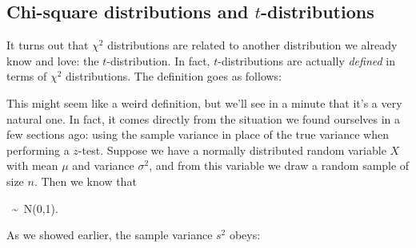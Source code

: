 
\subsection{Chi-square distributions and $t$-distributions}



It turns out that $\chi^2$ distributions are related to another distribution we already know and love: the $t$-distribution.  In fact, $t$-distributions are actually \emph{defined} in terms of $\chi^2$ distributions.  The definition goes as follows:



\begin{table}[h]

\begin{center}


\end{center}

\end{table}



This might seem like a weird definition, but we'll see in a minute that it's a very natural one.  In fact, it comes directly from the situation we found ourselves in a few sections ago: using the sample variance in place of the true variance when performing a $z$-test.  Suppose we have a normally distributed random variable $X$ with mean $\mu$ and variance $\sigma^2$, and from this variable we draw a random sample of size $n$.  Then we know that



\bel

\ \sim \ N(0,1).

\eel

As we showed earlier, the sample variance $s^2$ obeys:



